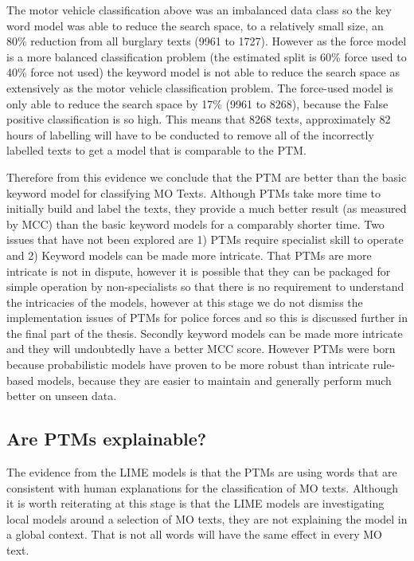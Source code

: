 The motor vehicle classification above  was an imbalanced data class so the key word model was able to reduce the search space, to a relatively small size, an 80\% reduction from all burglary texts (9961 to 1727). However as the force model is a more balanced classification problem (the estimated split is 60\% force used to 40\% force not used) the keyword model is not able to reduce the search space as extensively as the motor vehicle classification problem. The force-used model is only able to reduce the search space by 17\% (9961 to 8268), because the False positive classification is so high. This means that 8268 texts, approximately 82 hours of labelling will have to be conducted to remove all of the incorrectly labelled texts to get a model that is comparable to the PTM.

Therefore from this evidence we conclude that the PTM are better than the basic keyword model for classifying MO Texts. Although PTMs take more time to initially build and label the texts, they provide a much better result (as measured by MCC) than the basic keyword models for a comparably shorter time. Two issues that have not been explored are 1) PTMs require specialist skill to operate and 2) Keyword models can be made more intricate. That PTMs are more intricate is not in dispute, however it is possible that they can be packaged for simple operation by non-specialists so that there is no requirement to understand the intricacies of the models, however at this stage we do not dismiss the implementation issues of PTMs for police forces and so this is discussed further in the final part of the thesis. Secondly keyword models can be made more intricate and they will undoubtedly have a better MCC score. However PTMs were born because probabilistic models have proven to be more robust than intricate rule-based models, because they are easier to maintain and generally perform much better on unseen data.        

\subsection{Are PTMs explainable?} The evidence from the LIME models is that the PTMs are using words that are consistent with human explanations for the classification of MO texts. Although it is worth reiterating at this stage is that the LIME models are investigating local models around a selection of MO texts, they are not explaining the model in a global context. That is not all words will have the same effect in every MO text. 

